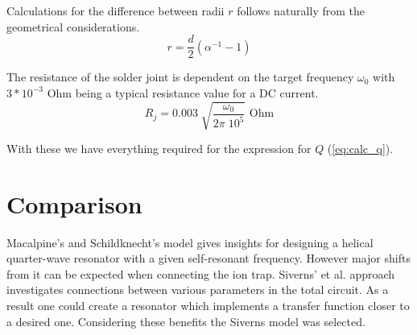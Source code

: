 Calculations for the difference between radii $r$ follows naturally from the geometrical considerations.
\begin{equation}
	r = \frac{d}{2} \left( \alpha^{-1} - 1 \right)
	\label{eq:calc_diff_r}
\end{equation}

The resistance of the solder joint is dependent on the target frequency $\omega_0$ with $3*10^{-3}$ Ohm being a typical resistance value for a DC current.
\begin{equation}
	R_j = 0.003 \; \sqrt{ \frac{\omega_0}{2\pi \; 10^5	} } \text{ Ohm}
	\label{eq:calc_R_j}
\end{equation}

With these we have everything required for the expression for $Q$ (\ref{eq:calc_q}).

\section{Comparison}
Macalpine's and Schildknecht's \cite{Macalpine2000} model gives insights for designing a helical quarter-wave resonator with a given self-resonant frequency. However major shifts from it can be expected when connecting the ion trap. Siverns' et al. approach \cite{Siverns2012} investigates connections between various parameters in the total circuit. As a result one could create a resonator which implements a transfer function closer to a desired one. Considering these benefits the Siverns model \cite{Siverns2012} was selected.